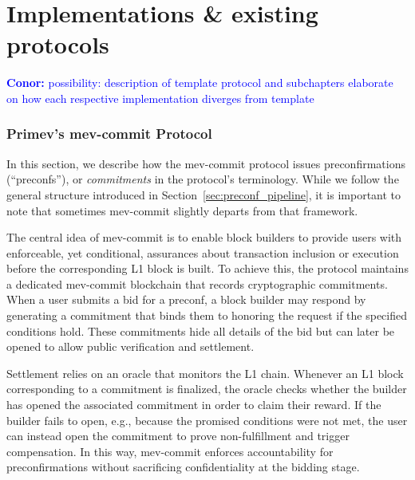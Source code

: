 \documentclass[a4paper]{article}
\theoremstyle{boldstyle}
\newcommand{\cm}[1]{\textcolor{blue}{\textbf{Conor:} #1}}
\begin{document}
        


\section{Implementations \& existing protocols}
    \cm{possibility: description of template protocol and subchapters elaborate on how each respective implementation diverges from template}
\subsubsection{\textbf{Primev's mev-commit Protocol}}
In this section, we describe how the mev-commit protocol issues preconfirmations (``preconfs''), or \emph{commitments} in the protocol's terminology. While we follow the general structure introduced in Section~\ref{sec:preconf_pipeline}, it is important to note that sometimes mev-commit slightly departs from that framework. 

The central idea of mev-commit is to enable block builders to provide users with enforceable, yet conditional, assurances about transaction inclusion or execution before the corresponding L1 block is built. To achieve this, the protocol maintains a dedicated mev-commit blockchain that records cryptographic commitments. When a user submits a bid for a preconf, a block builder may respond by generating a commitment that binds them to honoring the request if the specified conditions hold. These commitments hide all details of the bid but can later be opened to allow public verification and settlement. 

Settlement relies on an oracle that monitors the L1 chain. Whenever an L1 block corresponding to a commitment is finalized, the oracle checks whether the builder has opened the associated commitment in order to claim their reward. If the builder fails to open, e.g., because the promised conditions were not met, the user can instead open the commitment to prove non-fulfillment and trigger compensation. In this way, mev-commit enforces accountability for preconfirmations without sacrificing confidentiality at the bidding stage.
\end{document}
